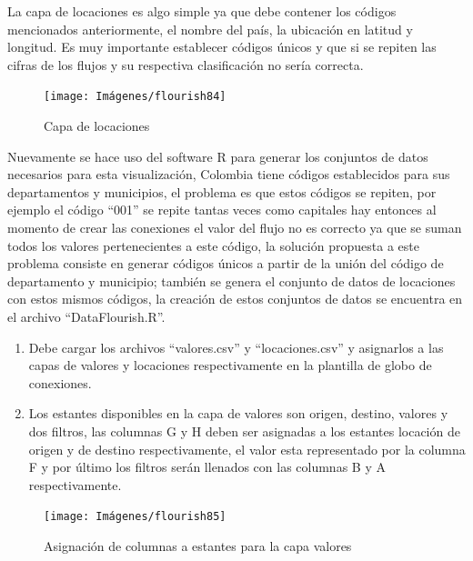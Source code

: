 \documentclass[
]{book}
\begin{document}
La capa de locaciones es algo simple ya que debe contener los códigos mencionados anteriormente, el nombre del país, la ubicación en latitud y longitud. Es muy importante establecer códigos únicos y que si se repiten las cifras de los flujos y su respectiva clasificación no sería correcta.

\begin{figure}

{\centering \texttt{[image: Imágenes/flourish84]} 

}

\caption{Capa de locaciones}\label{fig:capalocacionesgloboconexionesflourish-fig}
\end{figure}

Nuevamente se hace uso del software R para generar los conjuntos de datos necesarios para esta visualización, Colombia tiene códigos establecidos para sus departamentos y municipios, el problema es que estos códigos se repiten, por ejemplo el código ``001'' se repite tantas veces como capitales hay entonces al momento de crear las conexiones el valor del flujo no es correcto ya que se suman todos los valores pertenecientes a este código, la solución propuesta a este problema consiste en generar códigos únicos a partir de la unión del código de departamento y municipio; también se genera el conjunto de datos de locaciones con estos mismos códigos, la creación de estos conjuntos de datos se encuentra en el archivo ``DataFlourish.R''.

\begin{enumerate}
\def\labelenumi{\arabic{enumi}.}
\item
  Debe cargar los archivos ``valores.csv'' y ``locaciones.csv'' y asignarlos a las capas de valores y locaciones respectivamente en la plantilla de globo de conexiones.
\item
  Los estantes disponibles en la capa de valores son origen, destino, valores y dos filtros, las columnas G y H deben ser asignadas a los estantes locación de origen y de destino respectivamente, el valor esta representado por la columna F y por último los filtros serán llenados con las columnas B y A respectivamente.
\end{enumerate}

\begin{figure}

{\centering \texttt{[image: Imágenes/flourish85]} 

}

\caption{Asignación de columnas a estantes para la capa valores}\label{fig:paso2globoconexionesflourish-fig}
\end{figure}
\end{document}

